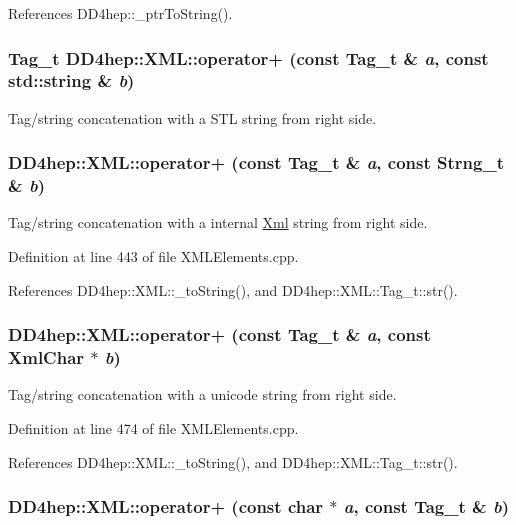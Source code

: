 References DD4hep::\_\-ptrToString().\hypertarget{group___d_d4_h_e_p___x_m_l_ga4296bedbf278d7bbd894b9e07bedf79a}{
\subsubsection[{operator+}]{\setlength{\rightskip}{0pt plus 5cm}Tag\_\-t DD4hep::XML::operator+ (const Tag\_\-t \& {\em a}, \/  const std::string \& {\em b})}}
\label{group___d_d4_h_e_p___x_m_l_ga4296bedbf278d7bbd894b9e07bedf79a}


Tag/string concatenation with a STL string from right side. \hypertarget{group___d_d4_h_e_p___x_m_l_ga64cd4f3e74d5147d8a0dda8d7dc5b372}{
\subsubsection[{operator+}]{ DD4hep::XML::operator+ (const {\bf Tag\_\-t} \& {\em a}, \/  const {\bf Strng\_\-t} \& {\em b})}}
\label{group___d_d4_h_e_p___x_m_l_ga64cd4f3e74d5147d8a0dda8d7dc5b372}


Tag/string concatenation with a internal \hyperlink{union_xml}{Xml} string from right side. 

Definition at line 443 of file XMLElements.cpp.

References DD4hep::XML::\_\-toString(), and DD4hep::XML::Tag\_\-t::str().\hypertarget{group___d_d4_h_e_p___x_m_l_ga658bb45f4c5cc614a2508957b27c0bd7}{
\subsubsection[{operator+}]{ DD4hep::XML::operator+ (const {\bf Tag\_\-t} \& {\em a}, \/  const XmlChar $\ast$ {\em b})}}
\label{group___d_d4_h_e_p___x_m_l_ga658bb45f4c5cc614a2508957b27c0bd7}


Tag/string concatenation with a unicode string from right side. 

Definition at line 474 of file XMLElements.cpp.

References DD4hep::XML::\_\-toString(), and DD4hep::XML::Tag\_\-t::str().\hypertarget{group___d_d4_h_e_p___x_m_l_ga16ba3dffdb36f1a0ae319fde7dcdb5ca}{
\subsubsection[{operator+}]{ DD4hep::XML::operator+ (const char $\ast$ {\em a}, \/  const {\bf Tag\_\-t} \& {\em b})}}
\label{group___d_d4_h_e_p___x_m_l_ga16ba3dffdb36f1a0ae319fde7dcdb5ca}



